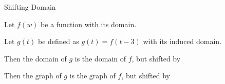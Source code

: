 \documentclass{ximera}
\begin{document}
\begin{example} Shifting Domain


Let $f(w)$ be a function with its domain.

Let $g(t)$ be defined as $g(t) = f(t-3)$ with its induced domain.


Then the domain of $g$ is the domain of $f$, but shifted  by 


Then the graph of $g$ is the graph of $f$, but shifted  by 




\end{example}
\end{document}
